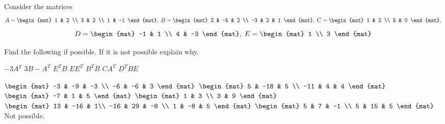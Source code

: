 
\begin{Exercise}[
name={},
title={}, 
difficulty=0,
origin={\cite{KK}}]
Consider the matrices
\[A =\begin{mat}
1 & 2 \\
3 & 2 \\
1 & -1
\end{mat},\; B=
\begin{mat}
2 & -5 & 2 \\
-3 & 2 & 1
\end{mat},\; 
C = \begin{mat}
1 & 2 \\
5 & 0
\end{mat},
\]
\[ D=
\begin{mat}
-1 & 1 \\
4 & -3
\end{mat},\; E=
\begin{mat}
1 \\
3
\end{mat}
\]

Find the following if possible. If it is not possible explain why. 
\begin{multicols}{3}
\Question $-3A{^T}$
\Question $3B - A^{T}$
\Question $E^{T}B$
\Question $EE^{T}$
\Question $B^{T}B$
\Question $CA^{T}$
\Question $D^{T}BE$
\EndCurrentQuestion
\end{multicols}
\end{Exercise}

\begin{Answer}
\Question $
\begin{mat}
-3 & -9 & -3 \\
-6 & -6 & 3
\end{mat}$
\Question $
\begin{mat}
5 & -18 & 5 \\
-11 & 4 & 4
\end{mat}$
\Question $
\begin{mat}
-7 & 1 & 5
\end{mat}$
\Question $
\begin{mat}
1 & 3 \\
3 & 9
\end{mat}$
\Question $
\begin{mat}
13 & -16 & 1\\
-16 & 29 & -8 \\
1 & -8 & 5
\end{mat}$
\Question $\begin{mat}
5 & 7 & -1 \\
5 & 15 & 5 
\end{mat}$
\Question Not possible.


\end{Answer}
